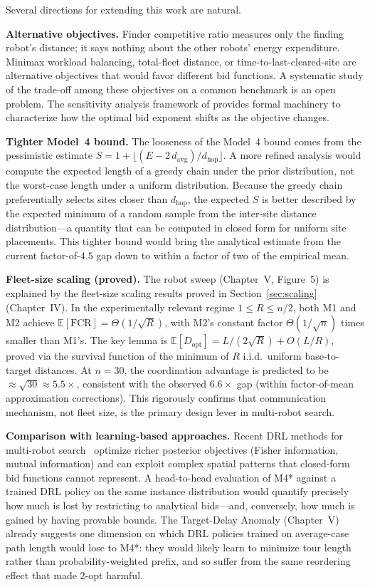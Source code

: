 \begin{doublespacing}
Several directions for extending this work are natural.

\textbf{Alternative objectives.} Finder competitive ratio measures
only the finding robot's distance; it says nothing about the other
robots' energy expenditure. Minimax workload balancing, total-fleet
distance, or time-to-last-cleared-site are alternative objectives that
would favor different bid functions. A systematic study of the
trade-off among these objectives on a common benchmark is an open
problem. The sensitivity analysis framework of \citet{AutomaticaAuctions2023}
provides formal machinery to characterize how the optimal bid exponent
shifts as the objective changes.

\textbf{Tighter Model~4 bound.} The looseness of the Model~4 bound
comes from the pessimistic estimate $S = 1 + \lfloor (E -
2\,d_{\mathrm{avg}}) / d_{\mathrm{hop}} \rfloor$. A more refined
analysis would compute the expected length of a greedy chain under the
prior distribution, not the worst-case length under a uniform
distribution. Because the greedy chain preferentially selects sites
closer than $d_{\mathrm{hop}}$, the expected $S$ is better described
by the expected minimum of a random sample from the inter-site
distance distribution---a quantity that can be computed in closed form
for uniform site placements. This tighter bound would bring the
analytical estimate from the current factor-of-$4.5$ gap down to
within a factor of two of the empirical mean.

\textbf{Fleet-size scaling (proved).} The robot sweep
(Chapter~V, Figure~5) is explained by the fleet-size scaling results
proved in Section~\ref{sec:scaling} (Chapter~IV).
In the experimentally relevant regime $1 \leq R \leq n/2$, both M1 and M2
achieve $\mathbb{E}[\mathrm{FCR}] = \Theta(1/\sqrt{R})$, with M2's
constant factor $\Theta(1/\sqrt{n})$ times smaller than M1's.
The key lemma is $\mathbb{E}[D_{\mathrm{opt}}] = L/(2\sqrt{R}) + O(L/R)$,
proved via the survival function of the minimum of $R$ i.i.d.\ uniform
base-to-target distances.
At $n = 30$, the coordination advantage is predicted to be
$\approx \sqrt{30} \approx 5.5\times$, consistent with the
observed $6.6\times$ gap (within factor-of-mean approximation corrections).
This rigorously confirms that communication mechanism, not fleet size,
is the primary design lever in multi-robot search.

\textbf{Comparison with learning-based approaches.} Recent DRL
methods for multi-robot search~\citep{KimKim2025} optimize richer
posterior objectives (Fisher information, mutual information) and
can exploit complex spatial patterns that closed-form bid functions
cannot represent. A head-to-head evaluation of M4* against a trained
DRL policy on the same instance distribution would quantify precisely
how much is lost by restricting to analytical bids---and, conversely,
how much is gained by having provable bounds. The Target-Delay
Anomaly (Chapter~V) already suggests one dimension on which DRL
policies trained on average-case path length would lose to M4*: they
would likely learn to minimize tour length rather than
probability-weighted prefix, and so suffer from the same reordering
effect that made 2-opt harmful.


\end{doublespacing}

